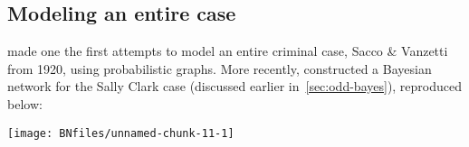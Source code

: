\documentclass{article}
\begin{document}




 




 
 







\subsection{Modeling an entire case}\label{subsec:completeBN}

\cite{kadane2011probabilistic}
made one the first attempts to model an entire criminal case, Sacco \& Vanzetti from 1920, using probabilistic graphs. More recently, \cite{Fenton2018Risk} constructed a Bayesian network for the Sally Clark case (discussed earlier in~\ref{sec:odd-bayes}), reproduced below:


%
\begin{center}\texttt{[image: BNfiles/unnamed-chunk-11-1]} \end{center}
\end{document}
